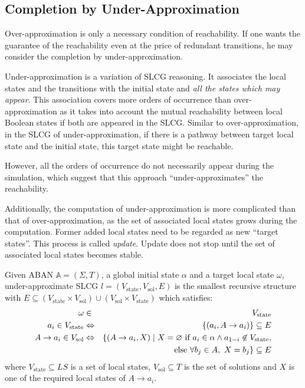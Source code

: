 \subsection{Completion by Under-Approximation}\label{sec:completionUnder}
Over-approximation is only a necessary condition of reachability.
If one wants the guarantee of the reachability even at the price of redundant transitions, he may consider the completion by under-approximation.

Under-approximation is a variation of SLCG reasoning. 
It associates the local states and the transitions with the initial state and \textit{all the states which may appear}.
This association covers more orders of occurrence than over-approximation as it takes into account the mutual reachability between local Boolean states if both are appeared in the SLCG.
Similar to over-approximation, in the SLCG of under-approximation, if there is a pathway between target local state and the initial state, this target state might be reachable.

However, all the orders of occurrence do not necessarily appear during the simulation, which suggest that this approach ``under-approximates'' the reachability.

Additionally, the computation of under-approximation is more complicated than that of over-approximation, as the set of associated local states grows during the computation.
Former added local states need to be regarded as new ``target states''.
This process is called \textit{update}. 
Update does not stop until the set of associated local states becomes stable.


\begin{definition}
Given ABAN $\mathbb{A} = (\Sigma,T)$, a global initial state $\alpha$ and a target local state $\omega$, under-approximate SLCG $l= (V_{\mathrm{state}},V_{\mathrm{sol}},E)$ is the smallest recursive structure with $E \subseteq (V_{\mathrm{state}}\times V_{\mathrm{sol}})\cup (V_{\mathrm{sol}}\times V_{\mathrm{state}})$ which satisfies:
\begin{eqnarray*}
    \omega&\in& V_{\mathrm{state}} \\
    a_i\in V_{\mathrm{state}} &\Leftrightarrow& \{ (a_i, A\to a_i)\}\subseteq E \\
    A\to a_i\in V_{\mathrm{sol}}&\Leftrightarrow& \{ (A\to a_i,X)\mid X= \varnothing \text{ \rm if } a_i\in \alpha\land a_{1-i}\not\in V_{\mathrm{state}},\\
    &&\text{else } \forall b_j\in A,\ X= b_j\}\subseteq E
\end{eqnarray*}
where $V_{\mathrm{state}}\subseteq LS$ is a set of local states, $V_{\mathrm{sol}}\subseteq T$ is the set of solutions and $X$ is one of the required local states of $A\to a_i$. 
\end{definition}

